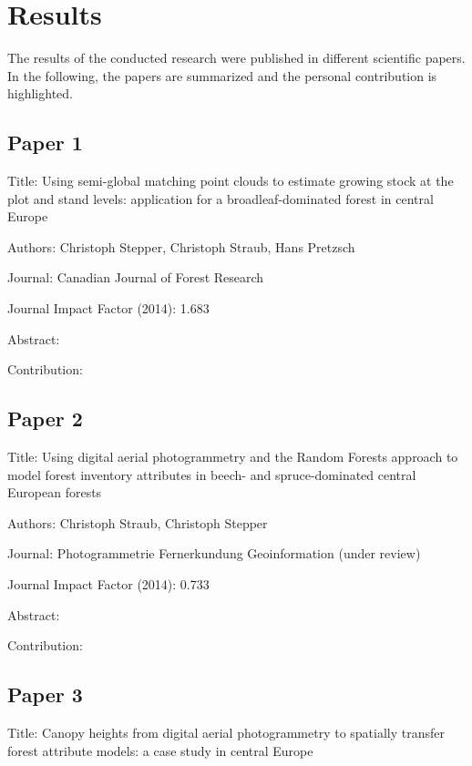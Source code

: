 \chapter{Results}
\label{chp:Results}

The results of the conducted research were published in different scientific papers. In the following, the papers are summarized and the personal contribution is highlighted. 


\section{Paper 1}\label{sec:Paper1}

Title: Using semi-global matching point clouds to estimate growing stock at the plot and stand levels: application for a broadleaf-dominated forest in central Europe 

Authors: Christoph Stepper, Christoph Straub, Hans Pretzsch

Journal: Canadian Journal of Forest Research

Journal Impact Factor (2014): 1.683 

Abstract: 

Contribution:



\section{Paper 2}\label{sec:Paper2}

Title: Using digital aerial photogrammetry and the Random Forests approach to model forest inventory attributes in beech- and spruce-dominated central European forests

Authors: Christoph Straub, Christoph Stepper

Journal: Photogrammetrie Fernerkundung Geoinformation (under review)

Journal Impact Factor (2014): 0.733

Abstract:

Contribution:



\section{Paper 3}\label{sec:Paper3}

Title: Canopy heights from digital aerial photogrammetry to spatially transfer forest attribute models: a case study in central Europe

